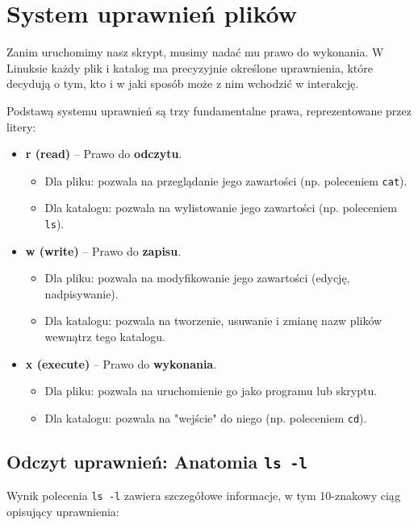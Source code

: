 \section{System uprawnień plików}
Zanim uruchomimy nasz skrypt, musimy nadać mu prawo do wykonania. W Linuksie każdy plik i katalog ma precyzyjnie określone uprawnienia, które decydują o tym, kto i w jaki sposób może z nim wchodzić w interakcję.

Podstawą systemu uprawnień są trzy fundamentalne prawa, reprezentowane przez litery:
\begin{itemize}
    \item \textbf{r (read)} – Prawo do \textbf{odczytu}.
    \begin{itemize}
        \item Dla pliku: pozwala na przeglądanie jego zawartości (np. poleceniem \texttt{cat}).
        \item Dla katalogu: pozwala na wylistowanie jego zawartości (np. poleceniem \texttt{ls}).
    \end{itemize}
    \item \textbf{w (write)} – Prawo do \textbf{zapisu}.
    \begin{itemize}
        \item Dla pliku: pozwala na modyfikowanie jego zawartości (edycję, nadpisywanie).
        \item Dla katalogu: pozwala na tworzenie, usuwanie i zmianę nazw plików wewnątrz tego katalogu.
    \end{itemize}
    \item \textbf{x (execute)} – Prawo do \textbf{wykonania}.
    \begin{itemize}
        \item Dla pliku: pozwala na uruchomienie go jako programu lub skryptu.
        \item Dla katalogu: pozwala na "wejście" do niego (np. poleceniem \texttt{cd}).
    \end{itemize}
\end{itemize}

\subsection{Odczyt uprawnień: Anatomia \texttt{ls -l}}
Wynik polecenia \texttt{ls -l} zawiera szczegółowe informacje, w tym 10-znakowy ciąg opisujący uprawnienia:

